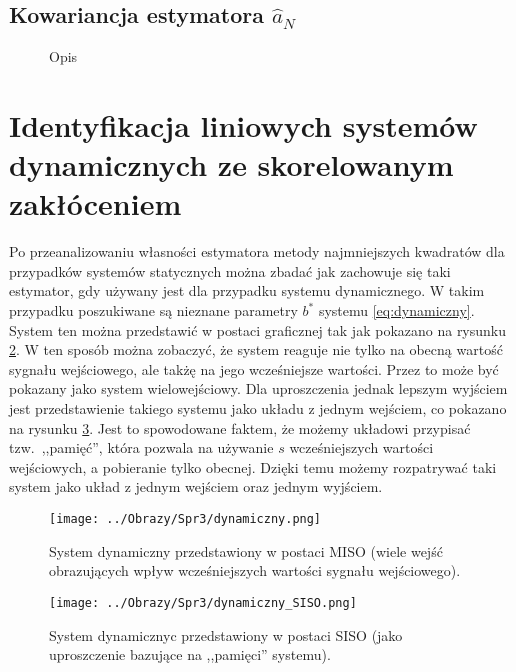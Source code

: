 \documentclass[12pt,a4paper]{article}
\begin{document}
\subsection{Kowariancja estymatora $\hat{a}_{N}$}
\begin{figure}[H]
\centering

\caption{Opis}
\label{fig:zdjecie}
\end{figure}


\newpage
\section{Identyfikacja liniowych systemów dynamicznych ze skorelowanym zakłóceniem}
Po przeanalizowaniu własności estymatora metody najmniejszych kwadratów dla przypadków systemów statycznych można zbadać jak zachowuje się taki estymator, gdy używany jest dla przypadku systemu dynamicznego.
W takim przypadku poszukiwane są nieznane parametry $b^{*}$ systemu \ref{eq:dynamiczny}.
System ten można przedstawić w postaci graficznej tak jak pokazano na rysunku \ref{fig:dynamiczny_MISO}. W ten sposób można zobaczyć, że system reaguje nie tylko na obecną wartość sygnału wejściowego, ale takżę na jego wcześniejsze wartości. Przez to może być pokazany jako system wielowejściowy.
Dla uproszczenia jednak lepszym wyjściem jest przedstawienie takiego systemu jako układu z jednym wejściem, co pokazano na rysunku \ref{fig:dynamiczny_SISO}. Jest to spowodowane faktem, że możemy układowi przypisać tzw.\ ,,pamięć'', która pozwala na używanie $s$ wcześniejszych wartości wejściowych, a pobieranie tylko obecnej.
Dzięki temu możemy rozpatrywać taki system jako układ z jednym wejściem oraz jednym wyjściem.

\begin{multicols}{2}
		\begin{figure}[H]
		\centering
		\texttt{[image: ../Obrazy/Spr3/dynamiczny.png]} 
		\caption{System dynamiczny przedstawiony w postaci MISO (wiele wejść obrazujących wpływ wcześniejszych wartości sygnału wejściowego).}
		\label{fig:dynamiczny_MISO}
		\end{figure}
	\columnbreak		
		\begin{figure}[H]
		\centering
		\texttt{[image: ../Obrazy/Spr3/dynamiczny\_SISO.png]} 
		\caption{System dynamicznyc przedstawiony w postaci SISO (jako uproszczenie bazujące na ,,pamięci'' systemu).}
		\label{fig:dynamiczny_SISO}
		\end{figure}
\end{multicols}
\end{document}
